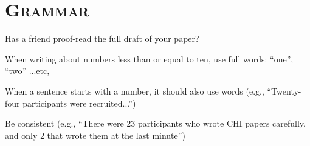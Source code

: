 \documentclass[12pt]{article} %
\begin{document}
	



\newpage
\section*{\textsc{Grammar}}

\begin{checklist}
	\item Has a friend proof-read the full draft of your paper? 
	\item When writing about numbers less than or equal to ten, use full words: ``one'', ``two'' ...etc, 
	\item When a sentence starts with a number, it should also use words (e.g., ``Twenty-four participants were recruited...'') 
	\item Be consistent (e.g., ``There were 23 participants who wrote CHI papers carefully, and only 2 that wrote them at the last minute'')
\end{checklist}



\noindent\makebox[\linewidth]{\rule{\linewidth}{0.4pt}}
\end{document}
